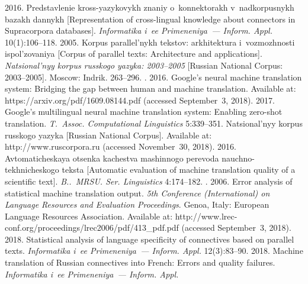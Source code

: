 \begin{multicols}{2}
{{\begin{thebibliography}{99}
 2016. 
Predstavlenie kross-yazykovykh znaniy o~konnektorakh v~nadkorpusnykh bazakh dannykh 
[Representation of cross-lingual knowledge about connectors in Supracorpora databases]. 
\textit{Informatika i~ee Primeneniya~--- Inform. Appl.} 10(1):106--118.
 2005. Korpus parallel'nykh 
tekstov: arkhitektura i~voz\-mozh\-nosti ispol'zovaniya [Corpus of parallel texts: Architecture and 
applications]. \textit{Natsional'nyy korpus russkogo yazyka: 2003--2005} [Russian National 
Corpus: 2003--2005]. Moscow: Indrik. 263--296.
. 2016. Google's neural machine translation system: Bridging 
the gap between human and machine translation. Available at: {\sf 
https://arxiv.org/pdf/1609.08144.pdf} (accessed September~3, 2018).
 2017. 
Google's multilingual neural machine translation system: Enabling zero-shot translation. 
\textit{T.~Assoc. Computational Linguistics} 5:339--351.
Natsional'nyy korpus russkogo yazyka [Russian National Corpus]. 
Available at: {\sf http://www.ruscorpora.ru} (accessed November~30, 2018).
 2016.  Avtomaticheskaya otsenka kachestva mashinnogo perevoda 
nauchno-tekhnicheskogo teksta [Automatic evaluation of machine translation quality of a scientific text]. 
\textit{B..~MRSU. Ser. 
Linguistics} 4:174--182.
. 2006. Error analysis of statistical machine 
translation output. \textit{5th Conference (International) on Language Resources and Evaluation 
Proceedings}. Genoa, Italy: European Language Resources Association. Available at: {\sf 
http://www.lrec-conf.org/proceedings/lrec2006/pdf/413\_pdf.pdf} (accessed September~3, 2018).
 2018. Statistical analysis of language specificity of 
connectives based on parallel texts. \textit{Informatika i~ee Primeneniya~--- Inform. Appl.}  
12(3):83--90.
 2018. Machine translation of Russian connectives 
into French: Errors and quality failures. \textit{Informatika i~ee Primeneniya~--- Inform. Appl.} 

\end{thebibliography}}}
\end{multicols}
